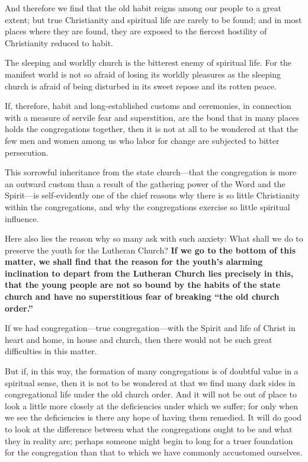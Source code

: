 And therefore we find that the old habit reigns among our people to a great extent; but true Christianity and spiritual life are rarely to be found; and in most places where they are found, they are exposed to the fiercest hostility of Christianity reduced to habit.

The sleeping and worldly church is the bitterest enemy of spiritual life. For the manifest world is not so afraid of losing its worldly pleasures as the sleeping church is afraid of being disturbed in its sweet repose and its rotten peace.

If, therefore, habit and long-established customs and ceremonies, in connection with a measure of servile fear and superstition, are the bond that in many places holds the congregations together, then it is not at all to be wondered at that the few men and women among us who labor for change are subjected to bitter persecution.

This sorrowful inheritance from the state church—that the congregation is more an outward custom than a result of the gathering power of the Word and the Spirit—is self‑evidently one of the chief reasons why there is so little Christianity within the congregations, and why the congregations exercise so little spiritual influence.

Here also lies the reason why so many ask with such anxiety: What shall we do to preserve the youth for the Lutheran Church? \textbf{If we go to the bottom of this matter, we shall find that the reason for the youth’s alarming inclination to depart from the Lutheran Church lies precisely in this, that the young people are not so bound by the habits of the state church and have no superstitious fear of breaking “the old church order.”}

If we had congregation—true congregation—with the Spirit and life of Christ in heart and home, in house and church, then there would not be such great difficulties in this matter.

But if, in this way, the formation of many congregations is of doubtful value in a spiritual sense, then it is not to be wondered at that we find many dark sides in congregational life under the old church order. And it will not be out of place to look a little more closely at the deficiencies under which we suffer; for only when we see the deficiencies is there any hope of having them remedied. It will do good to look at the difference between what the congregations ought to be and what they in reality are; perhaps someone might begin to long for a truer foundation for the congregation than that to which we have commonly accustomed ourselves.


